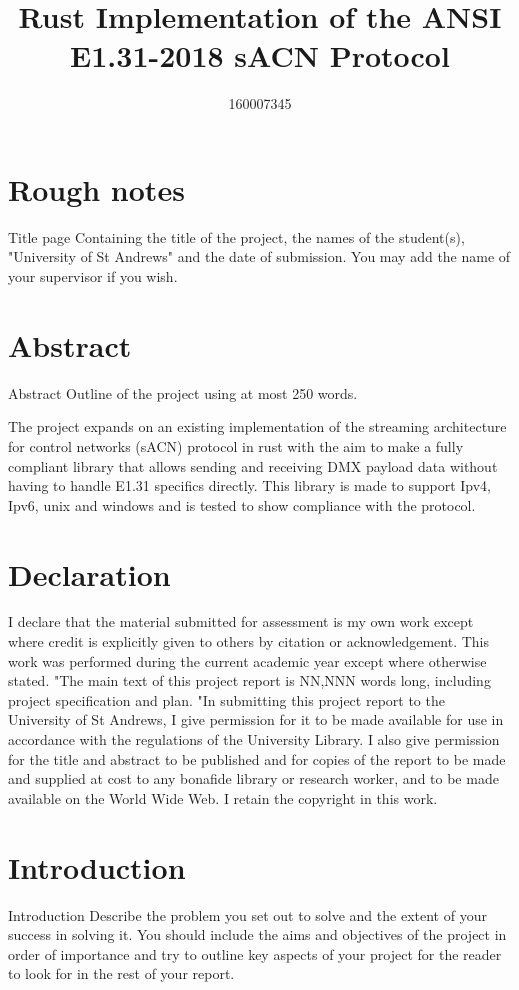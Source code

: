 \documentclass[11pt,a4paper,notitlepage]{report}
\author{160007345}
\title{Rust Implementation of the ANSI E1.31-2018 sACN Protocol}
\begin{document}
	\maketitle
	\section{Rough notes}
	Title page
	Containing the title of the project, the names of the
	student(s), "University of St Andrews" and the date of
	submission. You may add the name of your supervisor
	if you wish.
	
	\section{Abstract}
	Abstract Outline of the project using at most 250 words.
	
	The project expands on an existing implementation \cite{ORIGNIAL_IMPL} of the streaming architecture for control networks (sACN) protocol \cite{ANSI_E1.31} in rust with the aim to make a fully compliant library that allows sending and receiving DMX payload data without having to handle E1.31 specifics directly. This library is made to support Ipv4, Ipv6, unix and windows and is tested to show compliance with the protocol.
	
	\section{Declaration}
	I declare that the material submitted for
	assessment is my own work except where credit is
	explicitly given to others by citation or
	acknowledgement. This work was performed during
	the current academic year except where otherwise
	stated.
	"The main text of this project report is NN,NNN
	words long, including project specification and plan.
	"In submitting this project report to the University of
	St Andrews, I give permission for it to be made
	available for use in accordance with the regulations of the University Library. I also give permission for
	the title and abstract to be published and for copies of the report to be made and supplied at cost to any bonafide library or research worker, and to be made
	available on the World Wide Web. I retain the
	copyright in this work.
	
	
	\tableofcontents
	\pagebreak
	
	\section{Introduction}
		Introduction
		Describe the problem you set out to solve and the
		extent of your success in solving it. You should include
		the aims and objectives of the project in order of
		importance and try to outline key aspects of your
		project for the reader to look for in the rest of your
		report.
		
\end{document}
